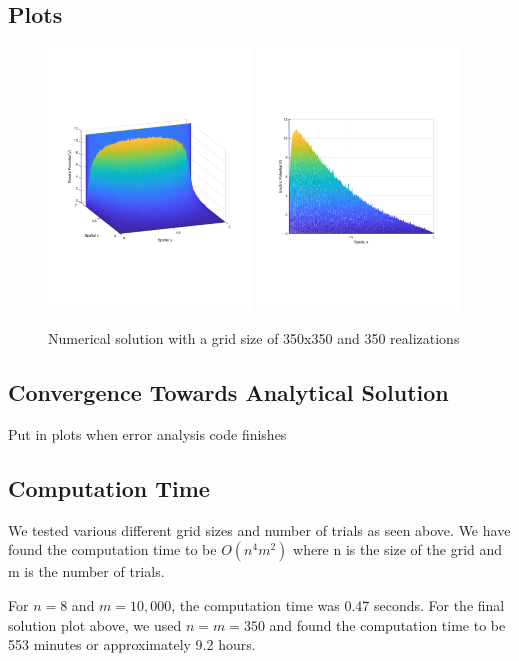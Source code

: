 \documentclass{amsart}
\begin{document}
\subsection{Plots}

\begin{figure}[H]
	\caption{Numerical solution with a grid size of 350x350 and 350 realizations}
	\includegraphics[width=0.48\textwidth]{solution_Dec11_9hrs_isoview.pdf}
	\includegraphics[width=0.48\textwidth]{solution_Dec11_9hrs_sideview.pdf}
\end{figure}

\subsection{Convergence Towards Analytical Solution}

Put in plots when error analysis code finishes

\subsection{Computation Time}

We tested various different grid sizes and number of trials as seen above. We have found the computation time to be $O(n^4m^2)$ where n is the size of the grid and m is the number of trials.

For $n = 8$ and $m = 10,000$, the computation time was 0.47 seconds. For the final solution plot above, we used $n = m = 350$ and found the computation time to be 553 minutes or approximately 9.2 hours.



\end{document}
